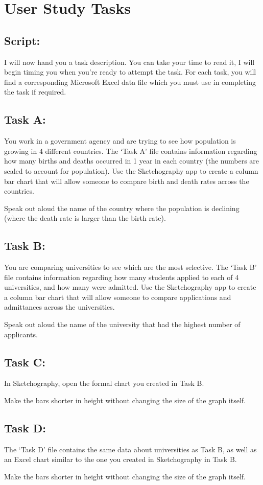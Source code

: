 \chapter{User Study Tasks}

\section*{Script:}

I will now hand you a task description. You can take your time to read it, I will begin timing you when you’re ready to attempt the task. For each task, you will find a corresponding Microsoft Excel data file which you must use in completing the task if required.

\section*{Task A:}

You work in a government agency and are trying to see how population is growing in 4 different countries. The ‘Task A’ file contains information regarding how many births and deaths occurred in 1 year in each country (the numbers are scaled to account for population). Use the Sketchography app to create a column bar chart that will allow someone to compare birth and death rates across the countries.

Speak out aloud the name of the country where the population is declining (where the death rate is larger than the birth rate).

\section*{Task B:}

You are comparing universities to see which are the most selective. The ‘Task B’ file contains information regarding how many students applied to each of 4 universities, and how many were admitted. Use the Sketchography app to create a column bar chart that will allow someone to compare applications and admittances across the universities.

Speak out aloud the name of the university that had the highest number of applicants.

\section*{Task C:}

In Sketchography, open the formal chart you created in Task B.

Make the bars shorter in height without changing the size of the graph itself.

\section*{Task D:}

The ‘Task D’ file contains the same data about universities as Task B, as well as an Excel chart similar to the one you created in Sketchography in Task B.

Make the bars shorter in height without changing the size of the graph itself.